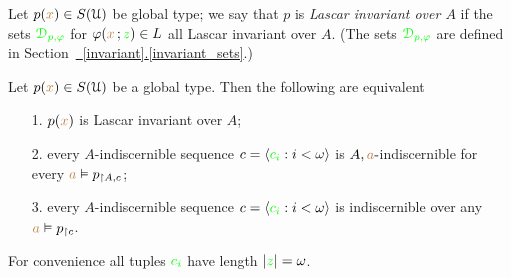 \documentclass[creche.tex]{subfiles}
\begin{document}
Let $p({\color{brown} x})\in S(\EuScript U)$ be global type; we say that $p$ is \emph{Lascar invariant over $A$\/} if the sets ${\color{green}\EuScript D_{p,\varphi}}$ for $\varphi({\color{brown} x}\,;{\color{green} z})\in L$ all Lascar invariant over $A$. (The sets ${\color{green}\EuScript D_{p,\varphi}}$ are defined in Section~\hyperref[invariant_sets]{~\ref*{invariant}.\ref*{invariant_sets}}.)

\begin{proposition}\label{prop_Lascar_indiscernibles}
  Let $p({\color{brown} x})\in S(\EuScript U)$ be a global type. Then the following are equivalent
  \begin{itemize}
    \item[1.] $p({\color{brown} x})$ is Lascar invariant over $A$;
    \item[2.] every $A$-indiscernible sequence $c=\langle{\color{green}c_i}:i<\omega\rangle$ is $A,{\color{brown} a}\mbox{-}$indiscernible for every ${\color{brown} a}\vDash p_{\restriction A, c}$;
    \item[3.] every $A$-indiscernible sequence $c=\langle{\color{green}c_i}:i<\omega\rangle$ is indiscernible over any ${\color{brown} a}\vDash p_{\restriction c}$.
  \end{itemize}
  For convenience all tuples ${\color{green} c_i}$ have length $|{\color{green} z}|=\omega$.
\end{proposition}
\end{document}
